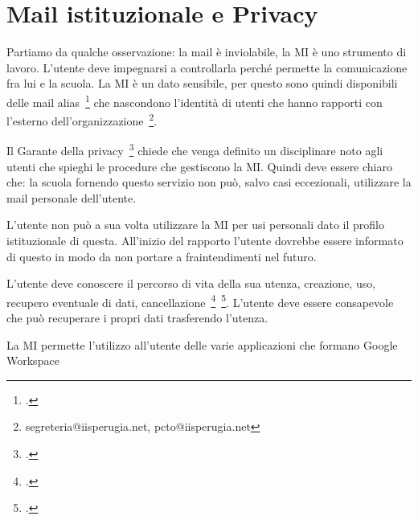 \section{Mail istituzionale e Privacy}
Partiamo da qualche osservazione: la mail è inviolabile, la 
MI è uno strumento di lavoro. L'utente deve impegnarsi a controllarla perché permette la comunicazione fra lui e la scuola. La MI è 
un dato sensibile, per questo sono quindi 
disponibili delle mail alias~\footcite{Garante2007} che nascondono l'identità di utenti 
che  hanno rapporti 
con l'esterno dell'organizzazione~\footnote{segreteria@iisperugia.net, pcto@iisperugia.net}. 

Il Garante della privacy~\footcite{Garante2007} chiede che 
venga definito un disciplinare noto agli utenti che spieghi le procedure che gestiscono la MI. Quindi deve essere chiaro che:
la scuola fornendo questo servizio non può, salvo casi eccezionali, utilizzare 
la mail personale dell'utente.

L'utente non può a sua volta utilizzare la MI per  usi  
personali dato il profilo istituzionale di questa.  All'inizio del rapporto l'utente dovrebbe essere informato di questo 
in modo da non portare a fraintendimenti nel futuro.

L'utente deve conoscere il percorso di vita della sua utenza, creazione, uso, 
recupero eventuale di dati, 
cancellazione~\footcite{Garante2007}~\footcite{Garante2019}. L'utente deve 
essere consapevole che 
può recuperare i propri dati trasferendo l'utenza. 

La MI permette l'utilizzo all'utente delle varie applicazioni che formano \textenglish{Google Workspace}